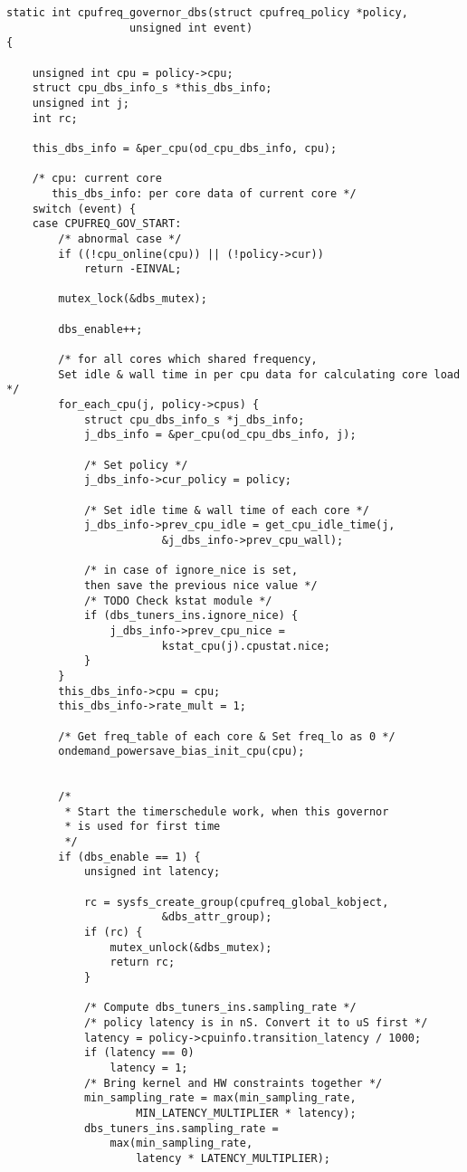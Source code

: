 \begin{lstlisting}
static int cpufreq_governor_dbs(struct cpufreq_policy *policy,
                   unsigned int event)
{

    unsigned int cpu = policy->cpu;
    struct cpu_dbs_info_s *this_dbs_info;
    unsigned int j;
    int rc;

    this_dbs_info = &per_cpu(od_cpu_dbs_info, cpu);

    /* cpu: current core
       this_dbs_info: per core data of current core */
    switch (event) {
    case CPUFREQ_GOV_START:
        /* abnormal case */
        if ((!cpu_online(cpu)) || (!policy->cur))
            return -EINVAL;

        mutex_lock(&dbs_mutex);

        dbs_enable++;

        /* for all cores which shared frequency, 
        Set idle & wall time in per cpu data for calculating core load */
        for_each_cpu(j, policy->cpus) {
            struct cpu_dbs_info_s *j_dbs_info;
            j_dbs_info = &per_cpu(od_cpu_dbs_info, j);

            /* Set policy */
            j_dbs_info->cur_policy = policy;

            /* Set idle time & wall time of each core */
            j_dbs_info->prev_cpu_idle = get_cpu_idle_time(j,
                        &j_dbs_info->prev_cpu_wall);
      
            /* in case of ignore_nice is set, 
            then save the previous nice value */
            /* TODO Check kstat module */
            if (dbs_tuners_ins.ignore_nice) {
                j_dbs_info->prev_cpu_nice =
                        kstat_cpu(j).cpustat.nice;
            }
        }
        this_dbs_info->cpu = cpu;
        this_dbs_info->rate_mult = 1;

        /* Get freq_table of each core & Set freq_lo as 0 */
        ondemand_powersave_bias_init_cpu(cpu);


        /*
         * Start the timerschedule work, when this governor
         * is used for first time
         */
        if (dbs_enable == 1) {
            unsigned int latency;

            rc = sysfs_create_group(cpufreq_global_kobject,
                        &dbs_attr_group);
            if (rc) {
                mutex_unlock(&dbs_mutex);
                return rc;
            }

            /* Compute dbs_tuners_ins.sampling_rate */
            /* policy latency is in nS. Convert it to uS first */
            latency = policy->cpuinfo.transition_latency / 1000;
            if (latency == 0)
                latency = 1;
            /* Bring kernel and HW constraints together */
            min_sampling_rate = max(min_sampling_rate,
                    MIN_LATENCY_MULTIPLIER * latency);
            dbs_tuners_ins.sampling_rate =
                max(min_sampling_rate,
                    latency * LATENCY_MULTIPLIER);


\end{lstlisting}
